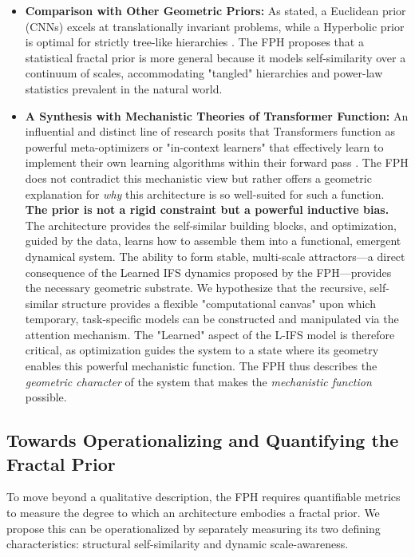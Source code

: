 \documentclass[11pt,a4paper]{article}
\begin{document}
\begin{itemize}
    \item \textbf{Comparison with Other Geometric Priors:} As stated, a Euclidean prior (CNNs) excels at translationally invariant problems, while a Hyperbolic prior is optimal for strictly tree-like hierarchies \citep{nickel2017poincare}. The FPH proposes that a statistical fractal prior is more general because it models self-similarity over a continuum of scales, accommodating "tangled" hierarchies and power-law statistics prevalent in the natural world.

    \item \textbf{A Synthesis with Mechanistic Theories of Transformer Function:} An influential and distinct line of research posits that Transformers function as powerful meta-optimizers or "in-context learners" that effectively learn to implement their own learning algorithms within their forward pass \citep{garg2022what, vonoswald2023transformers}. The FPH does not contradict this mechanistic view but rather offers a geometric explanation for \textit{why} this architecture is so well-suited for such a function. \textbf{The prior is not a rigid constraint but a powerful inductive bias.} The architecture provides the self-similar building blocks, and optimization, guided by the data, learns how to assemble them into a functional, emergent dynamical system. The ability to form stable, multi-scale attractors—a direct consequence of the Learned IFS dynamics proposed by the FPH—provides the necessary geometric substrate. We hypothesize that the recursive, self-similar structure provides a flexible "computational canvas" upon which temporary, task-specific models can be constructed and manipulated via the attention mechanism. The "Learned" aspect of the L-IFS model is therefore critical, as optimization guides the system to a state where its geometry enables this powerful mechanistic function. The FPH thus describes the \textit{geometric character} of the system that makes the \textit{mechanistic function} possible.
\end{itemize}

\subsection{Towards Operationalizing and Quantifying the Fractal Prior}
To move beyond a qualitative description, the FPH requires quantifiable metrics to measure the degree to which an architecture embodies a fractal prior. We propose this can be operationalized by separately measuring its two defining characteristics: structural self-similarity and dynamic scale-awareness.
\end{document}

